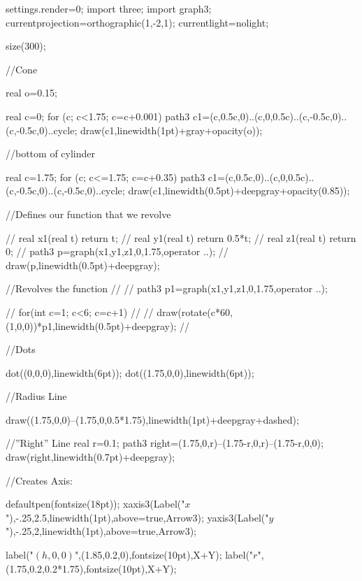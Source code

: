   	settings.render=0;
	import three;
    import graph3;
    currentprojection=orthographic(1,-2,1);
    currentlight=nolight;

	size(300);
    
    
    //Cone
    
    real o=0.15;
    
   	real c=0;
    for (c; c<1.75; c=c+0.001)
    {
        path3 c1=(c,0.5c,0)..(c,0,0.5c)..(c,-0.5c,0)..(c,-0.5c,0)..cycle;
    	draw(c1,linewidth(1pt)+gray+opacity(o));
    } 
    
    //bottom of cylinder
    
	real c=1.75;
    for (c; c<=1.75; c=c+0.35)
    {
        path3 c1=(c,0.5c,0)..(c,0,0.5c)..(c,-0.5c,0)..(c,-0.5c,0)..cycle;
    	draw(c1,linewidth(0.5pt)+deepgray+opacity(0.85));
    }
        
   	//Defines our function that we revolve
    
  //  	real x1(real t) {return t;}
	//	real y1(real t) {return 0.5*t;}
	//	real z1(real t) {return 0;}
  //  	path3 p=graph(x1,y1,z1,0,1.75,operator ..);
  //      draw(p,linewidth(0.5pt)+deepgray);
    
    //Revolves the function
   //     
	//	path3 p1=graph(x1,y1,z1,0,1.75,operator ..);
        
   //     for(int c=1; c<6; c=c+1)
   //     {
   //     	draw(rotate(c*60,(1,0,0))*p1,linewidth(0.5pt)+deepgray);
   //     }
        
    
    //Dots
    
    dot((0,0,0),linewidth(6pt));
    dot((1.75,0,0),linewidth(6pt));
    
    //Radius Line
    
    draw((1.75,0,0)--(1.75,0,0.5*1.75),linewidth(1pt)+deepgray+dashed);
    
    //''Right'' Line
    real r=0.1;
    path3 right=(1.75,0,r)--(1.75-r,0,r)--(1.75-r,0,0);
    draw(right,linewidth(0.7pt)+deepgray);
   

	//Creates Axis:

    defaultpen(fontsize(18pt));
    xaxis3(Label("$x$"),-.25,2.5,linewidth(1pt),above=true,Arrow3);
    yaxis3(Label("$y$"),-.25,2,linewidth(1pt),above=true,Arrow3);
    
    
    label("$(h,0,0)$",(1.85,0.2,0),fontsize(10pt),X+Y);
    label("$r$",(1.75,0.2,0.2*1.75),fontsize(10pt),X+Y);